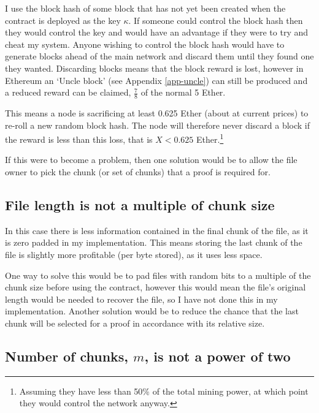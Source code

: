 \documentclass[12pt,a4paper,twoside,openright]{report}
\begin{document}
I use the block hash of some block that has not yet been created when the contract is deployed as the key $\kappa$.
If someone could control the block hash then they would control the key and would have an advantage if they were to try and cheat my system.
Anyone wishing to control the block hash would have to generate blocks ahead of the main network
and discard them until they found one they wanted.
Discarding blocks means that the block reward is lost,
however in Ethereum an `Uncle block' (see Appendix \ref{app-uncle}) can still be produced and a reduced reward can be claimed, $\frac{7}{8}$ 
of the normal 5 Ether.

This means a node is sacrificing at least 0.625 Ether (about  at current prices)
to re-roll a new random block hash.
The node will therefore never discard a block if the reward is less than this loss, that is $X < 0.625$ Ether.\footnote{Assuming they have less than 50\%
of the total mining power, at which point they would control the network anyway.}

If this were to become a problem, then one solution would be to allow the file owner to pick the chunk (or set of chunks)
that a proof is required for.


\subsection{File length is not a multiple of chunk size}
\label{file-len-chunk-size}

In this case there is less information contained in the final chunk of the file, as it is zero padded in my implementation.
This means storing the last chunk of the file is slightly more profitable (per byte stored), as it uses less space.

One way to solve this would be to pad files with random bits to a multiple of the chunk size before using the contract,
however this would mean the file's original length would be needed to recover the file, so I have not done this in my implementation.
Another solution would be to reduce the chance that the last chunk will be selected for a proof in accordance with its relative size.

\subsection{Number of chunks, $m$, is not a power of two}
\label{file-len-chunk-num}
\end{document}
